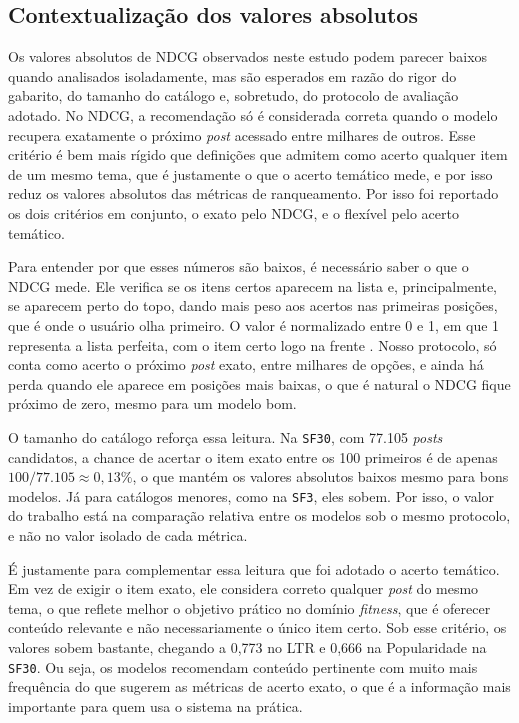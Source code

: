 \documentclass[a4paper,12pt]{article}
\begin{document}
{\subsection{Contextualização dos valores absolutos}

Os valores absolutos de NDCG observados neste estudo podem parecer baixos quando analisados isoladamente, mas são esperados em razão do rigor do gabarito, do tamanho do catálogo e, sobretudo, do protocolo de avaliação adotado. No NDCG, a recomendação só é considerada correta quando o modelo recupera exatamente o próximo \textit{post} acessado entre milhares de outros. Esse critério é bem mais rígido que definições que admitem como acerto qualquer item de um mesmo tema, que é justamente o que o acerto temático mede, e por isso reduz os valores absolutos das métricas de ranqueamento. Por isso foi reportado os dois critérios em conjunto, o exato pelo NDCG, e o flexível pelo acerto temático.

Para entender por que esses números são baixos, é necessário saber o que o NDCG mede. Ele verifica se os itens certos aparecem na lista e, principalmente, se aparecem perto do topo, dando mais peso aos acertos nas primeiras posições, que é onde o usuário olha primeiro. O valor é normalizado entre 0 e 1, em que 1 representa a lista perfeita, com o item certo logo na frente \cite{Jarvelin2002NDCG}. Nosso protocolo, só conta como acerto o próximo \textit{post} exato, entre milhares de opções, e ainda há perda quando ele aparece em posições mais baixas, o que é natural o NDCG fique próximo de zero, mesmo para um modelo bom.

O tamanho do catálogo reforça essa leitura. Na \texttt{SF30}, com 77.105 \textit{posts} candidatos, a chance de acertar o item exato entre os 100 primeiros é de apenas \(100/77.105 \approx 0{,}13\%\), o que mantém os valores absolutos baixos mesmo para bons modelos. Já para catálogos menores, como na \texttt{SF3}, eles sobem. Por isso, o valor do trabalho está na comparação relativa entre os modelos sob o mesmo protocolo, e não no valor isolado de cada métrica.

É justamente para complementar essa leitura que foi adotado o acerto temático. Em vez de exigir o item exato, ele considera correto qualquer \textit{post} do mesmo tema, o que reflete melhor o objetivo prático no domínio \textit{fitness}, que é oferecer conteúdo relevante e não necessariamente o único item certo. Sob esse critério, os valores sobem bastante, chegando a 0,773 no LTR e 0,666 na Popularidade na \texttt{SF30}. Ou seja, os modelos recomendam conteúdo pertinente com muito mais frequência do que sugerem as métricas de acerto exato, o que é a informação mais importante para quem usa o sistema na prática.


}
\end{document}
